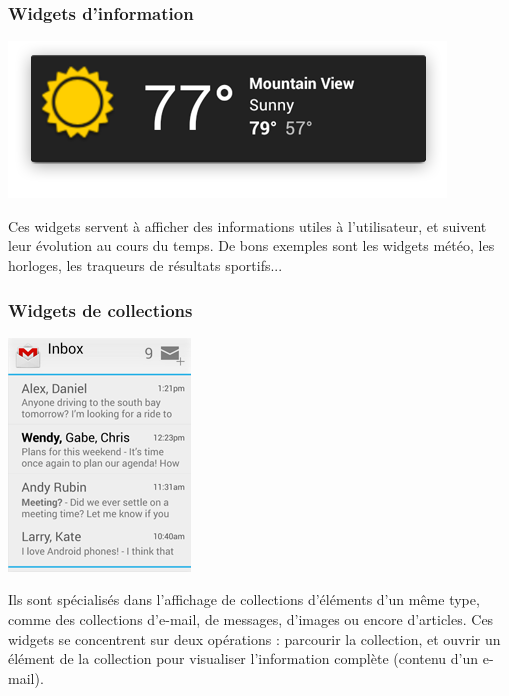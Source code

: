 \documentclass{beamer}
\begin{document}
\begin{frame}
\frametitle{Widgets d'information}
\begin{center}
\includegraphics[scale=0.3]{widgets_info.png}
\end{center}

Ces widgets servent à afficher des informations utiles à l'utilisateur, et suivent leur évolution au cours du temps. De bons exemples sont les widgets météo, les horloges, les traqueurs de résultats sportifs...
\end{frame}

\begin{frame}
\frametitle{Widgets de collections}
\begin{center}
\includegraphics[scale=0.4]{widgets_collection_gmail.png}
\end{center}

Ils sont spécialisés dans l'affichage de collections d'éléments d'un même type, comme des collections d'e-mail, de messages, d'images ou encore d’articles. Ces widgets se concentrent sur deux opérations : parcourir la collection, et ouvrir un élément de la collection pour visualiser l'information complète (contenu d'un e-mail).
\end{frame}
\end{document}

